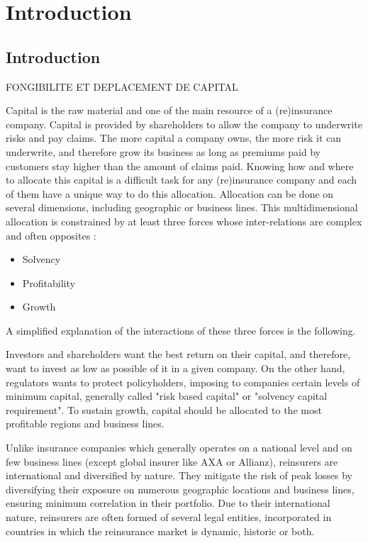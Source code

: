 \chapter{Introduction}

\section{Introduction}

FONGIBILITE ET DEPLACEMENT DE CAPITAL

Capital is the raw material and one of the main resource of a (re)insurance company. Capital is provided by shareholders to allow the company to underwrite risks and pay claims. The more capital a company owns, the more risk it can underwrite, and therefore grow its business as long as premiums paid by customers stay higher than the amount of claims paid.
Knowing how and where to allocate this capital is a difficult task for any (re)insurance company and each of them have a unique way to do this allocation. Allocation can be done on several dimensions, including geographic or business lines.
This multidimensional allocation is constrained by at least three forces whose inter-relations are complex and often opposites \cite{Rousseau2017}:

\begin{itemize}
\itemsep0em 
\item Solvency
\item Profitability
\item Growth
\end{itemize}

A simplified explanation of the interactions of these three forces is the following. 

Investors and shareholders want the best return on their capital, and therefore, want to invest as low as possible of it in a given company. On the other hand, regulators wants to protect policyholders, imposing to companies certain levels of minimum capital, generally called "risk based capital" or "solvency capital requirement". To sustain growth, capital should be allocated to the most profitable regions and business lines.

Unlike insurance companies which generally operates on a national level and on few business lines (except global insurer like AXA or Allianz), reinsurers are international and diversified by nature. They mitigate the risk of peak losses by diversifying their exposure on numerous geographic locations and business lines, ensuring minimum correlation in their portfolio. Due to their international nature, reinsurers are often formed of several legal entities, incorporated in countries in which the reinsurance market is dynamic, historic or both.


